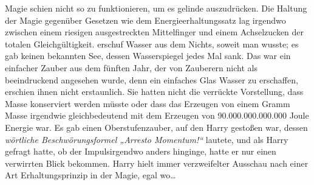 Magie schien nicht so zu funktionieren, um es gelinde auszudrücken. Die Haltung der Magie gegenüber Gesetzen wie dem Energieerhaltungssatz lag irgendwo zwischen einem riesigen ausgestreckten Mittelfinger und einem Achselzucken der totalen Gleichgültigkeit.  erschuf Wasser aus dem Nichts, soweit man wusste; es gab keinen bekannten See, dessen Wasserspiegel jedes Mal sank. Das war ein einfacher Zauber aus dem fünften Jahr, der von Zauberern nicht als beeindruckend angesehen wurde, denn ein einfaches Glas Wasser zu erschaffen, erschien ihnen nicht erstaunlich. Sie hatten nicht die verrückte Vorstellung, dass Masse konserviert werden müsste oder dass das Erzeugen von einem Gramm Masse irgendwie gleichbedeutend mit dem Erzeugen von 90.000.000.000.000 Joule Energie war. Es gab einen Oberstufenzauber, auf den Harry gestoßen war, dessen \emph{wörtliche Beschwörungsformel „Arresto Momentum!“} lautete, und als Harry gefragt hatte, ob der Impulsirgendwo anders hinginge, hatte er nur einen verwirrten Blick bekommen. Harry hielt immer verzweifelter Ausschau nach einer Art Erhaltungsprinzip in der Magie, egal wo…

